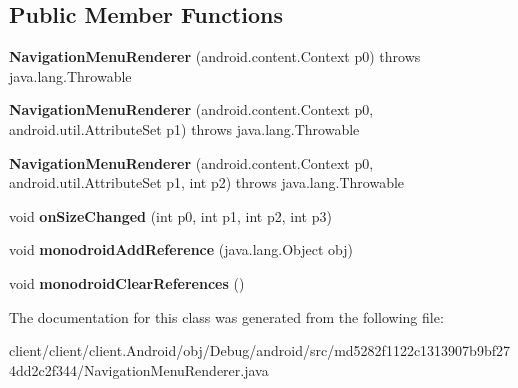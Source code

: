 \subsection*{Public Member Functions}
\begin{DoxyCompactItemize}
\item 
\hypertarget{classmd5282f1122c1313907b9bf274dd2c2f344_1_1NavigationMenuRenderer_a0323aa11601b436626682ead31a6aec9}{}{\bfseries Navigation\+Menu\+Renderer} (android.\+content.\+Context p0)  throws java.\+lang.\+Throwable 	\label{classmd5282f1122c1313907b9bf274dd2c2f344_1_1NavigationMenuRenderer_a0323aa11601b436626682ead31a6aec9}

\item 
\hypertarget{classmd5282f1122c1313907b9bf274dd2c2f344_1_1NavigationMenuRenderer_af8e9a8c28024b876792b90583df22510}{}{\bfseries Navigation\+Menu\+Renderer} (android.\+content.\+Context p0, android.\+util.\+Attribute\+Set p1)  throws java.\+lang.\+Throwable 	\label{classmd5282f1122c1313907b9bf274dd2c2f344_1_1NavigationMenuRenderer_af8e9a8c28024b876792b90583df22510}

\item 
\hypertarget{classmd5282f1122c1313907b9bf274dd2c2f344_1_1NavigationMenuRenderer_a3a56a354eb2cae0076b5b2aa19d424f0}{}{\bfseries Navigation\+Menu\+Renderer} (android.\+content.\+Context p0, android.\+util.\+Attribute\+Set p1, int p2)  throws java.\+lang.\+Throwable 	\label{classmd5282f1122c1313907b9bf274dd2c2f344_1_1NavigationMenuRenderer_a3a56a354eb2cae0076b5b2aa19d424f0}

\item 
\hypertarget{classmd5282f1122c1313907b9bf274dd2c2f344_1_1NavigationMenuRenderer_a4cb2f7e8ee82cd158b562f4d1d207073}{}void {\bfseries on\+Size\+Changed} (int p0, int p1, int p2, int p3)\label{classmd5282f1122c1313907b9bf274dd2c2f344_1_1NavigationMenuRenderer_a4cb2f7e8ee82cd158b562f4d1d207073}

\item 
\hypertarget{classmd5282f1122c1313907b9bf274dd2c2f344_1_1NavigationMenuRenderer_a33a400854cbbc490fae9d489ed16c396}{}void {\bfseries monodroid\+Add\+Reference} (java.\+lang.\+Object obj)\label{classmd5282f1122c1313907b9bf274dd2c2f344_1_1NavigationMenuRenderer_a33a400854cbbc490fae9d489ed16c396}

\item 
\hypertarget{classmd5282f1122c1313907b9bf274dd2c2f344_1_1NavigationMenuRenderer_aec477c485e968e23131c6b3ff97904f3}{}void {\bfseries monodroid\+Clear\+References} ()\label{classmd5282f1122c1313907b9bf274dd2c2f344_1_1NavigationMenuRenderer_aec477c485e968e23131c6b3ff97904f3}

\end{DoxyCompactItemize}


The documentation for this class was generated from the following file\+:\begin{DoxyCompactItemize}
\item 
client/client/client.\+Android/obj/\+Debug/android/src/md5282f1122c1313907b9bf274dd2c2f344/Navigation\+Menu\+Renderer.\+java\end{DoxyCompactItemize}
